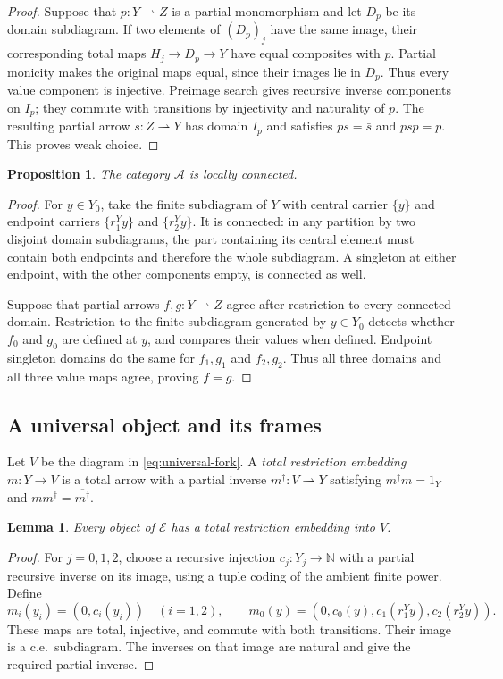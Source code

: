 \documentclass[11pt]{article}
\newtheorem{proposition}[theorem]{Proposition}
\newtheorem{lemma}[theorem]{Lemma}
\newcommand{\N}{\mathbb N}
\begin{document}
\begin{proof}
Suppose that $p:Y\rightharpoonup Z$ is a partial monomorphism
and let $D_p$ be its domain subdiagram. If two elements of $(D_p)_j$
have the same image, their corresponding total maps
$H_j\to D_p\to Y$ have equal composites with $p$.
Partial monicity makes the original maps equal, since their
images lie in $D_p$. Thus every value component is injective.
Preimage search gives recursive inverse components on $I_p$;
they commute with transitions by injectivity and naturality of $p$.
The resulting partial arrow $s:Z\rightharpoonup Y$ has domain
$I_p$ and satisfies $ps=\bar s$ and $psp=p$.
This proves weak choice.
\end{proof}

\begin{proposition}\label{prop:fork-local}
The category $\mathcal A$ is locally connected.
\end{proposition}
\begin{proof}
For $y\in Y_0$, take the finite subdiagram of $Y$ with central
carrier $\{y\}$ and endpoint carriers
$\{r_1^Yy\}$ and $\{r_2^Yy\}$. It is connected: in any partition
by two disjoint domain subdiagrams, the part containing its central
element must contain both endpoints and therefore the whole
subdiagram. A singleton at either endpoint, with the other
components empty, is connected as well.

Suppose that partial arrows $f,g:Y\rightharpoonup Z$ agree
after restriction to every connected domain. Restriction to the
finite subdiagram generated by $y\in Y_0$ detects whether
$f_0$ and $g_0$ are defined at $y$, and compares their values
when defined. Endpoint singleton domains do the same for
$f_1,g_1$ and $f_2,g_2$. Thus all three domains and all three
value maps agree, proving $f=g$.
\end{proof}

\subsection{A universal object and its frames}

Let $V$ be the diagram in \eqref{eq:universal-fork}.
A \emph{total restriction embedding} $m:Y\to V$ is a total
arrow with a partial inverse $m^\dagger:V\rightharpoonup Y$
satisfying $m^\dagger m=1_Y$ and $mm^\dagger=\overline{m^\dagger}$.

\begin{lemma}\label{lem:fork-dominance}
Every object of $\mathcal E$ has a total restriction embedding
into $V$.
\end{lemma}
\begin{proof}
For $j=0,1,2$, choose a recursive injection $c_j:Y_j\to\N$
with a partial recursive inverse on its image, using a tuple
coding of the ambient finite power. Define
\[
 m_i(y_i)=(0,c_i(y_i))\quad(i=1,2),\qquad
 m_0(y)=(0,c_0(y),c_1(r_1^Yy),c_2(r_2^Yy)).
\]
These maps are total, injective, and commute with both transitions.
Their image is a c.e.\ subdiagram. The inverses on that image
are natural and give the required partial inverse.
\end{proof}
\end{document}
